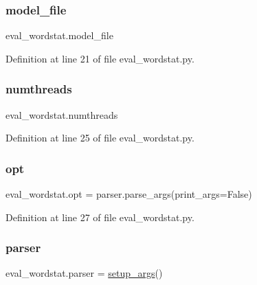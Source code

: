 \subsubsection{\texorpdfstring{model\+\_\+file}{model\_file}}
{\footnotesize\ttfamily eval\+\_\+wordstat.\+model\+\_\+file}



Definition at line 21 of file eval\+\_\+wordstat.\+py.

\mbox{\label{namespaceeval__wordstat_ad91a8093b019c0b0088d47b27816373d}} 
\subsubsection{\texorpdfstring{numthreads}{numthreads}}
{\footnotesize\ttfamily eval\+\_\+wordstat.\+numthreads}



Definition at line 25 of file eval\+\_\+wordstat.\+py.

\mbox{\label{namespaceeval__wordstat_a47d20263ebe9cfadbc2d479ba8ac1e25}} 
\subsubsection{\texorpdfstring{opt}{opt}}
{\footnotesize\ttfamily eval\+\_\+wordstat.\+opt = parser.\+parse\+\_\+args(print\+\_\+args=False)}



Definition at line 27 of file eval\+\_\+wordstat.\+py.

\mbox{\label{namespaceeval__wordstat_a46e86ff5435363475d0171c9bde00fc8}} 
\subsubsection{\texorpdfstring{parser}{parser}}
{\footnotesize\ttfamily eval\+\_\+wordstat.\+parser = \hyperlink{namespaceeval__wordstat_a3872be823cf90eb2beb19e7aeb94a898}{setup\+\_\+args}()}



